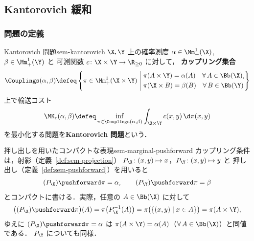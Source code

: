 \subsection{Kantorovich 緩和}
\label{sec:sem-kantorovich}

\subsubsection{問題の定義}

\begin{definition}{Kantorovich 問題}{sem-kantorovich}
  $\X, \Y$ 上の確率測度 $\alpha \in \Mm_+^1(\X)$, $\beta \in \Mm_+^1(\Y)$ と
  可測関数 $c \colon \X \times \Y \to \R_{\geq 0}$ に対して，
  \textbf{カップリング集合}
  \[
    \Couplings(\alpha, \beta) \defeq
    \left\{ \pi \in \Mm_+^1(\X \times \Y) \;\middle|\;
      \begin{aligned}
        &\pi(A \times \Y) = \alpha(A) \quad \forall\, A \in \Bb(\X), \\
        &\pi(\X \times B) = \beta(B)  \quad \forall\, B \in \Bb(\Y)
      \end{aligned}
    \right\}
  \]
  上で輸送コスト
  \[
    \MK_c(\alpha, \beta) \defeq
    \inf_{\pi \in \Couplings(\alpha, \beta)}
    \int_{\X \times \Y} c(x, y) \, \d\pi(x, y)
  \]
  を最小化する問題を\textbf{Kantorovich 問題}という．
\end{definition}

\begin{remark}{押し出しを用いたコンパクトな表現}{sem-marginal-pushforward}
  カップリング条件は，射影（定義~\ref{def:sem-projection}）
  $P_\X \colon (x,y) \mapsto x$，$P_\Y \colon (x,y) \mapsto y$ と
  押し出し（定義~\ref{def:sem-pushforward}）を用いると
  \[
    (P_\X)\pushforward \pi = \alpha, \qquad (P_\Y)\pushforward \pi = \beta
  \]
  とコンパクトに書ける．実際，任意の $A \in \Bb(\X)$ に対して
  \[
    \bigl((P_\X)\pushforward \pi\bigr)(A)
    = \pi\bigl(P_\X^{-1}(A)\bigr)
    = \pi\bigl(\{(x,y) \mid x \in A\}\bigr)
    = \pi(A \times \Y),
  \]
  ゆえに $(P_\X)\pushforward \pi = \alpha$ は
  $\pi(A \times \Y) = \alpha(A)$（$\forall\, A \in \Bb(\X)$）と同値である．
  $P_\Y$ についても同様．
\end{remark}

